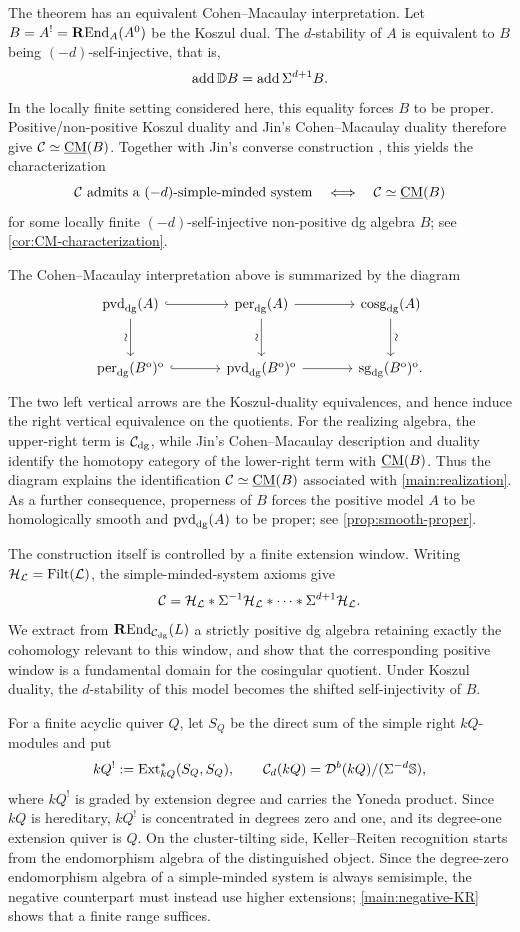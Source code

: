 \documentclass[11pt,a4paper,dvipsnames,x11names]{amsart}
\begin{document}
The theorem has an equivalent Cohen--Macaulay interpretation. Let $B=A^!=\operatorname{\mathbf{R}End}_A(A^0)$ be the Koszul dual. The $d$-stability of $A$ is equivalent to $B$ being $(-d)$-self-injective, that is,
\[
\operatorname{add}\mathbb D B=\operatorname{add}\Sigma^{d+1}B.
\]
In the locally finite setting considered here, this equality forces $B$ to be proper. Positive/non-positive Koszul duality and Jin's Cohen--Macaulay duality therefore give $\mathcal C\simeq\underline{\operatorname{CM}}(B)$. Together with Jin's converse construction \cite[Theorem~5.6]{Jin20}, this yields the characterization
\[
\mathcal C\text{ admits a $(-d)$-simple-minded system}
\quad\Longleftrightarrow\quad
\mathcal C\simeq\underline{\operatorname{CM}}(B)
\]
for some locally finite $(-d)$-self-injective non-positive dg algebra $B$; see \cref{cor:CM-characterization}.

The Cohen--Macaulay interpretation above is summarized by the diagram
\[
\begin{tikzcd}[column sep=large,row sep=large]
\pvd_{\dg}(A) \arrow[r,hook] \arrow[d,"\sim"',sloped] &
\per_{\dg}(A) \arrow[r] \arrow[d,"\sim"',sloped] &
\cosg_{\dg}(A) \arrow[d,"\sim",sloped] \\
\per_{\dg}(B^{\mathrm{o}})^{\mathrm{o}} \arrow[r,hook] &
\pvd_{\dg}(B^{\mathrm{o}})^{\mathrm{o}} \arrow[r] &
\sg_{\dg}(B^{\mathrm{o}})^{\mathrm{o}}.
\end{tikzcd}
\]
The two left vertical arrows are the Koszul-duality equivalences, and hence induce the right vertical equivalence on the quotients. For the realizing algebra, the upper-right term is $\mathcal C_{\mathrm{dg}}$, while Jin's Cohen--Macaulay description and duality identify the homotopy category of the lower-right term with $\underline{\operatorname{CM}}(B)$. Thus the diagram explains the identification $\mathcal C\simeq\underline{\operatorname{CM}}(B)$ associated with \cref{main:realization}. As a further consequence, properness of $B$ forces the positive model $A$ to be homologically smooth and $\operatorname{pvd}_{\mathrm{dg}}(A)$ to be proper; see \cref{prop:smooth-proper}.

The construction itself is controlled by a finite extension window. Writing $\mathcal H_{\mathcal L}=\operatorname{Filt}(\mathcal L)$, the simple-minded-system axioms give
\[
\mathcal C=\mathcal H_{\mathcal L}*\Sigma^{-1}\mathcal H_{\mathcal L}*\cdots*\Sigma^{d+1}\mathcal H_{\mathcal L}.
\]
We extract from $\operatorname{\mathbf{R}End}_{\mathcal C_{\mathrm{dg}}}(L)$ a strictly positive dg algebra retaining exactly the cohomology relevant to this window, and show that the corresponding positive window is a fundamental domain for the cosingular quotient. Under Koszul duality, the $d$-stability of this model becomes the shifted self-injectivity of $B$.

For a finite acyclic quiver $Q$, let $S_Q$ be the direct sum of the simple right $kQ$-modules and put
\[
kQ^!:=\operatorname{Ext}^*_{kQ}(S_Q,S_Q),
\qquad
\mathcal C_d(kQ)=\mathcal D^b(kQ)/(\Sigma^{-d}\mathbb S),
\]
where $kQ^!$ is graded by extension degree and carries the Yoneda product. Since $kQ$ is hereditary, $kQ^!$ is concentrated in degrees zero and one, and its degree-one extension quiver is $Q$.
On the cluster-tilting side, Keller--Reiten recognition starts from the endomorphism algebra of the distinguished object. Since the degree-zero endomorphism algebra of a simple-minded system is always semisimple, the negative counterpart must instead use higher extensions; \cref{main:negative-KR} shows that a finite range suffices.
\end{document}
